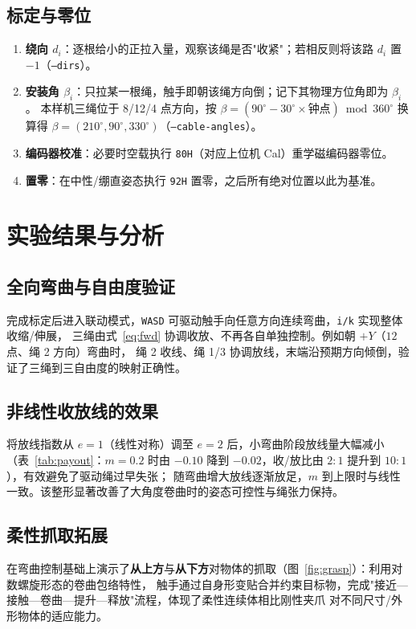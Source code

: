 \documentclass[12pt,a4paper]{ctexart}
\newcommand{\code}[1]{\texttt{#1}}
\begin{document}
\subsection{标定与零位}
\begin{enumerate}[leftmargin=2em]
  \item \textbf{绕向 $d_i$}：逐根给小的正拉入量，观察该绳是否"收紧"；若相反则将该路 $d_i$ 置 $-1$（\code{--dirs}）。
  \item \textbf{安装角 $\beta_i$}：只拉某一根绳，触手即朝该绳方向倒；记下其物理方位角即为 $\beta_i$。
        本样机三绳位于 8/12/4 点方向，按 $\beta=(90^\circ-30^\circ\times\text{钟点})\bmod 360^\circ$ 换算得
        $\beta=(210^\circ,90^\circ,330^\circ)$（\code{--cable-angles}）。
  \item \textbf{编码器校准}：必要时空载执行 \code{80H}（对应上位机 Cal）重学磁编码器零位。
  \item \textbf{置零}：在中性/绷直姿态执行 \code{92H} 置零，之后所有绝对位置以此为基准。
\end{enumerate}

\section{实验结果与分析}

\subsection{全向弯曲与自由度验证}
完成标定后进入联动模式，\code{WASD} 可驱动触手向任意方向连续弯曲，\code{i/k} 实现整体收缩/伸展，
三绳由式~\eqref{eq:fwd} 协调收放、不再各自单独控制。例如朝 $+Y$（$12$ 点、绳 2 方向）弯曲时，
绳 2 收线、绳 1/3 协调放线，末端沿预期方向倾倒，验证了三绳到三自由度的映射正确性。

\subsection{非线性收放线的效果}
将放线指数从 $e=1$（线性对称）调至 $e=2$ 后，小弯曲阶段放线量大幅减小（表~\ref{tab:payout}：$m=0.2$ 时由
$-0.10$ 降到 $-0.02$，收/放比由 $2\!:\!1$ 提升到 $10\!:\!1$），有效避免了驱动绳过早失张；
随弯曲增大放线逐渐放足，$m$ 到上限时与线性一致。该整形显著改善了大角度卷曲时的姿态可控性与绳张力保持。

\subsection{柔性抓取拓展}
在弯曲控制基础上演示了\textbf{从上方}与\textbf{从下方}对物体的抓取（图~\ref{fig:grasp}）：利用对数螺旋形态的卷曲包络特性，
触手通过自身形变贴合并约束目标物，完成"接近—接触—卷曲—提升—释放"流程，体现了柔性连续体相比刚性夹爪
对不同尺寸/外形物体的适应能力。
\end{document}
